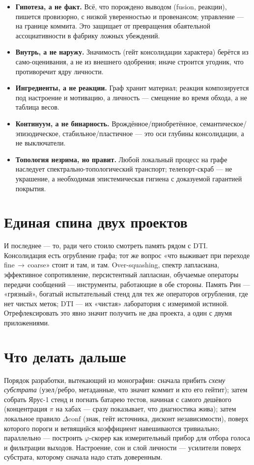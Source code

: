 \begin{itemize}
\item \textbf{Гипотеза, а не факт.} Всё, что порождено выводом (fusion, реакции),
пишется провизорно, с низкой уверенностью и провенансом; управление — на границе
коммита. Это защищает от превращения обаятельной ассоциативности в фабрику ложных
убеждений.
\item \textbf{Внутрь, а не наружу.} Значимость (гейт консолидации характера)
берётся из само-оценивания, а не из внешнего одобрения; иначе строится угодник, что
противоречит ядру личности.
\item \textbf{Ингредиенты, а не реакции.} Граф хранит материал; реакция
композируется под настроение и мотивацию, а личность — смещение во время обхода, а
не таблица весов.
\item \textbf{Континуум, а не бинарность.} Врождённое/приобретённое,
семантическое/эпизодическое, стабильное/пластичное — это оси глубины консолидации,
а не выключатели.
\item \textbf{Топология незрима, но правит.} Любой локальный процесс на графе
наследует спектрально-топологический транспорт; телепорт-скраб — не украшение, а
необходимая эпистемическая гигиена с доказуемой гарантией покрытия.
\end{itemize}

\section{Единая спина двух проектов}

И последнее — то, ради чего стоило смотреть память рядом с DTI. Консолидация есть
огрубление графа; тот же вопрос «что выживает при переходе fine\,$\to$\,coarse»
стоит и там, и там. Over-squashing, спектр лапласиана, эффективное сопротивление,
персистентный лапласиан, обучаемые операторы передачи сообщений — инструменты,
работающие в обе стороны. Память Рин — «грязный», богатый испытательный стенд для
тех же операторов огрубления, где нет чистых меток; DTI — их «чистая» лаборатория с
измеримой истиной. Отрефлексировать это явно значит получить не два проекта, а один
с двумя приложениями.

\section{Что делать дальше}

Порядок разработки, вытекающий из монографии: сначала прибить \emph{схему
субстрата} (узел/ребро, метаданные, что значит коммит и кто его гейтит); затем
собрать Ярус-1 стенд и погнать батарею тестов, начиная с самого дешёвого
(концентрация $\pi$ на хабах — сразу показывает, что диагностика жива); затем
локальное правило $\Delta\text{conf}$ (знак, гейт источника, дисконт
независимости), поверх которого пороги и ветвящийся коэффициент навешиваются
тривиально; параллельно — построить $\varphi$-скорер как измерительный прибор для
отбора голоса и фильтрации выходов. Настроение, сон и слой личности — усилители
поверх субстрата, которому сначала надо стать доверенным.
